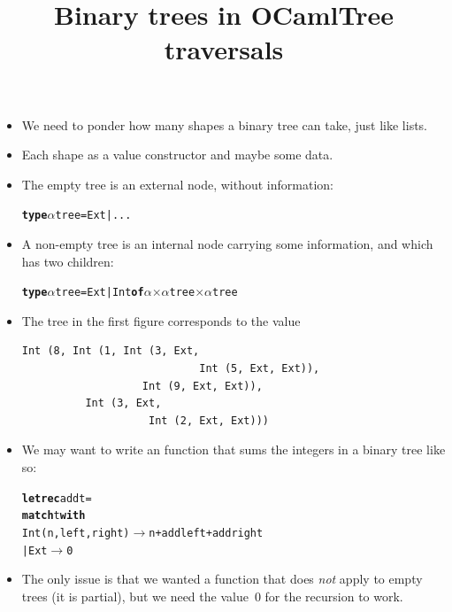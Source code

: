 \documentclass[wide]{slides}
\begin{document}
\begin{slide}
  \title{Binary trees in OCaml}

  \begin{itemize}

    \item We need to ponder how many shapes a binary tree can take,
      just like lists.

    \item Each shape as a value constructor and maybe some data.

    \item The empty tree is an external node, without information:
\begin{alltt}
\textbf{type} \(\alpha\) tree = Ext | ...
\end{alltt}

    \item A non\hyp{}empty tree is an internal node carrying some
      information, and which has two children:
\begin{alltt}
\textbf{type} \(\alpha\) tree = Ext | Int \textbf{of} \(\alpha\) \(\times\) \(\alpha\) tree \(\times\) \(\alpha\) tree
\end{alltt}

    \item The tree in the first figure corresponds to the
      \OCaml value
\begin{verbatim}
Int (8, Int (1, Int (3, Ext,
                            Int (5, Ext, Ext)),
                   Int (9, Ext, Ext)),
          Int (3, Ext,
                    Int (2, Ext, Ext)))
\end{verbatim}

  \end{itemize}

\end{slide}

\begin{slide}
  \title{Tree traversals}

  \begin{itemize}

    \item We may want to write an \OCaml function that sums the
      integers in a binary tree like so:
\begin{alltt}
\textbf{let rec} add t =
  \textbf{match} t \textbf{with}
    Int (n, left, right) \(\rightarrow\) n + add left + add right
  | Ext \(\rightarrow\) 0
\end{alltt}

    \item The only issue is that we wanted a function that does
      \emph{not} apply to empty trees (it is partial), but we need the
      value~\(0\) for the recursion to work.

  \end{itemize}

\end{slide}
\end{document}
